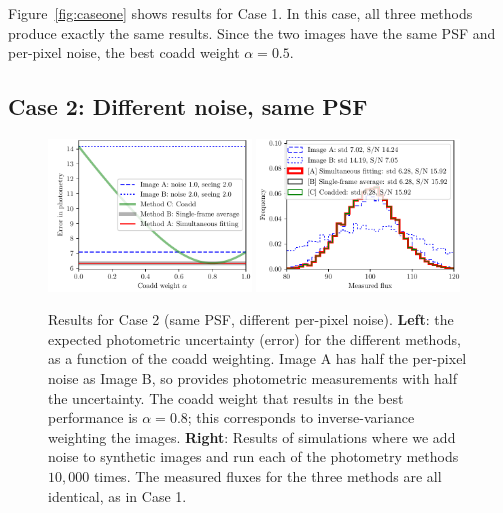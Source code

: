 \documentclass[a4paper,11pt]{article}
\begin{document}
Figure~\ref{fig:caseone} shows results for Case 1.  In this case, all
three methods produce exactly the same results.  Since the two images
have the same PSF and per-pixel noise, the best coadd weight $\alpha =
0.5$.

\newpage

\subsection*{Case 2: Different noise, same PSF}

\begin{figure}[b!]
  \begin{center}
    \includegraphics[width=0.48\textwidth]{coadd-02}
    \includegraphics[width=0.48\textwidth]{coadd-03}
  \end{center}
  \caption{Results for Case 2 (same PSF, different per-pixel noise).
    \textbf{Left}: the expected photometric
    uncertainty (error) for the different methods, as a function of
    the coadd weighting.  Image A has half the per-pixel noise as Image B,
    so provides photometric measurements with half the uncertainty.
    The coadd weight that results in the best performance is $\alpha = 0.8$;
    this corresponds to inverse-variance weighting the images.
    \newline \textbf{Right}: Results of simulations where we
    add noise to synthetic images and run each of the
    photometry methods $10,000$ times.  The measured fluxes for
    the three methods are all identical, as in Case 1.
    \label{fig:casetwo}}
\end{figure}
\end{document}
